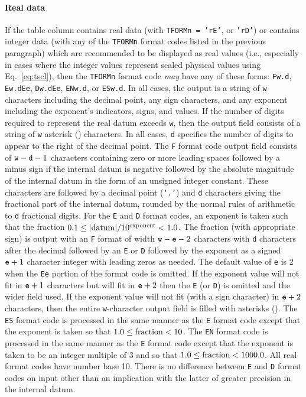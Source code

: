 \documentclass[11pt,makeidx]{book}     %
\begin{document}
 \paragraph{Real data}  If the table column contains real data
 (with {\tt TFORMn = 'rE'}, or {\tt 'rD'}) or contains integer data
 (with any of the {\tt TFORMn} 
 format codes listed in the previous paragraph) which are recommended 
 to be displayed
 as real values (i.e., especially in cases where the
 integer values represent scaled physical values using Eq.\ \ref{eq:tscl}), 
 then the {\tt TFORMn} format code {\em may} have any of these forms:
 {\tt F}{\tt w.d\/}, 
 {\tt E}{\tt w.d\/}{\tt E}{\tt e\/}, {\tt D}{\tt w.d\/}{\tt E}{\tt e\/},
 {\tt EN}{\tt w.d\/}, or {\tt ES}{\tt w.d\/}. In all cases, the output
 is a string of {\tt w} characters including the decimal point, any sign
 characters, and any exponent including the exponent's indicators,
 signs, and values.  If the number of digits required to represent the
 real datum exceeds {\tt w}, then the output field consists of a string of
 {\tt w} asterisk ({\tt *}) characters.  In all cases, {\tt d} specifies the
 number of digits to appear to the right of the decimal point.  The
 {\tt F} format code output field consists of ${\tt w} - {\tt d} - 1$ characters
 containing zero or more leading spaces followed by a minus sign if the
 internal datum is negative followed by the absolute magnitude of the
 internal datum in the form of an unsigned integer constant.  These
 characters are followed by a decimal point ({\tt `.'}) and {\tt d}
 characters giving the fractional part of the internal datum, rounded
 by the normal rules of arithmetic to {\tt d} fractional digits.  For the
 {\tt E} and {\tt D} format codes, an exponent is taken such that the
 fraction $0.1 \le |{\rm datum}| / 10^{\rm exponent} < 1.0$.  The fraction (with
 appropriate sign) is output with an {\tt F} format of width 
 $ {\tt w} - {\tt e} - 2$
 characters with {\tt d} characters after the decimal followed by an {\tt E}
 or {\tt D} followed by the exponent as a signed ${\tt e} + 1$ character 
 integer
 with leading zeros as needed.  The default value of {\tt e} is 2 
 when the {\tt E}{\tt e} portion of the format code is omitted.  If
 the exponent value will not fit in ${\tt e} + 1$ characters but will fit in
 ${\tt e} + 2$ then the {\tt E} (or {\tt D}) is omitted and the wider field
 used.  If the exponent value will not fit (with a sign character) in
 ${\tt e} + 2$ characters, then the entire {\tt w}-character output field is 
 filled
 with asterisks ({\tt *}).  The {\tt ES} format code is processed in
 the same manner as the {\tt E} format code except that the exponent is
 taken so that $ 1.0 \leq {\rm fraction} < 10$.  The {\tt EN} format code is
 processed in the same manner as the {\tt E} format code except that
 the exponent is taken to be an integer multiple of 3 and so that 
 $ 1.0\leq {\rm fraction} < 1000.0$.   All real format codes have number base
 10. There is no difference between {\tt E} and {\tt D} format codes
 on input other than an implication with the latter of 
 greater precision in the internal datum.
 
\end{document}
